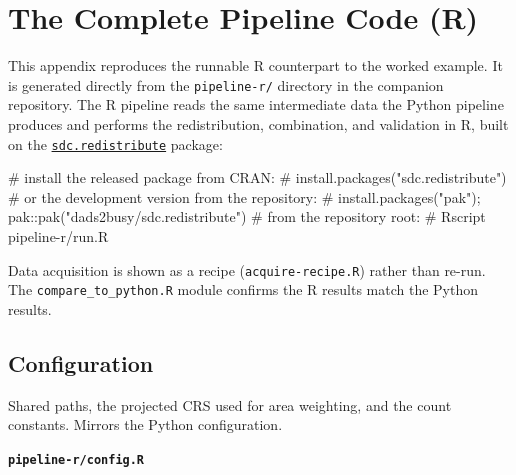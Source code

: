 \documentclass[
  letterpaper,
  DIV=11,
  numbers=noendperiod]{scrreprt}
\newenvironment{Shaded}{\begin{snugshade}}{\end{snugshade}}
\newcommand{\CommentTok}[1]{\textcolor[rgb]{0.37,0.37,0.37}{#1}}
\begin{document}

\chapter{The Complete Pipeline Code (R)}\label{sec-code-r}

This appendix reproduces the runnable R counterpart to the worked
example. It is generated directly from the \texttt{pipeline-r/}
directory in the companion repository. The R pipeline reads the same
intermediate data the Python pipeline produces and performs the
redistribution, combination, and validation in R, built on the
\href{https://cran.r-project.org/package=sdc.redistribute}{\texttt{sdc.redistribute}}
package:

\begin{Shaded}
\begin{Highlighting}[]
\CommentTok{\# install the released package from CRAN:}
\CommentTok{\# install.packages("sdc.redistribute")}
\CommentTok{\# or the development version from the repository:}
\CommentTok{\# install.packages("pak"); pak::pak("dads2busy/sdc.redistribute")}
\CommentTok{\# from the repository root:}
\CommentTok{\# Rscript pipeline{-}r/run.R}
\end{Highlighting}
\end{Shaded}

Data acquisition is shown as a recipe (\texttt{acquire-recipe.R}) rather
than re-run. The \texttt{compare\_to\_python.R} module confirms the R
results match the Python results.

\section{Configuration}\label{configuration-1}

Shared paths, the projected CRS used for area weighting, and the count
constants. Mirrors the Python configuration.

\textbf{\texttt{pipeline-r/config.R}}
\end{document}
